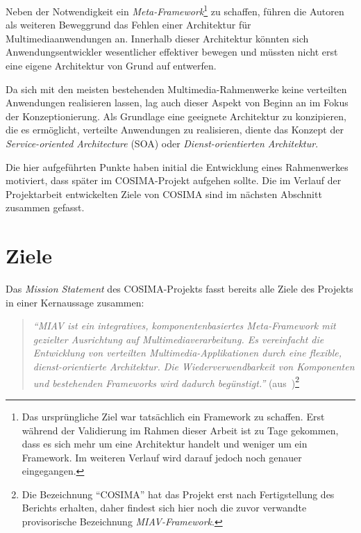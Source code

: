   Neben der Notwendigkeit ein \emph{Meta-Framework}\footnote{Das ursprüngliche Ziel war tatsächlich ein Framework zu schaffen. Erst während der Validierung im Rahmen dieser Arbeit ist zu Tage gekommen, dass es sich mehr um eine Architektur handelt und weniger um ein Framework. Im weiteren Verlauf wird darauf jedoch noch genauer eingegangen.} zu schaffen, führen die Autoren als weiteren Beweggrund das Fehlen einer Architektur für Multimediaanwendungen an. Innerhalb dieser Architektur könnten sich Anwendungsentwickler wesentlicher effektiver bewegen und müssten nicht erst eine eigene Architektur von Grund auf entwerfen.
  
  Da sich mit den meisten bestehenden Multimedia-Rahmenwerke keine verteilten Anwendungen realisieren lassen, lag auch dieser Aspekt von Beginn an im Fokus der Konzeptionierung. Als Grundlage eine geeignete Architektur zu konzipieren, die es ermöglicht, verteilte Anwendungen zu realisieren, diente das Konzept der \emph{Service-oriented Architecture} (SOA) oder \emph{Dienst-orientierten Architektur}.
  
  Die hier aufgeführten Punkte haben initial die Entwicklung eines Rahmenwerkes motiviert, dass später im COSIMA-Projekt aufgehen sollte. Die im Verlauf der Projektarbeit entwickelten Ziele von COSIMA sind im nächsten Abschnitt zusammen gefasst.

  
\section{Ziele} %
\label{sec:ziele_cosima}

  Das \emph{Mission Statement} des COSIMA-Projekts fasst bereits alle Ziele des Projekts in einer Kernaussage zusammen:

  \begin{quote}
    \emph{``MIAV ist ein integratives, komponentenbasiertes Meta-Framework mit gezielter Ausrichtung auf Multimediaverarbeitung. Es vereinfacht die Entwicklung von verteilten Multimedia-Applikationen durch eine flexible, dienst-orientierte Architektur. Die Wiederverwendbarkeit von Komponenten und bestehenden Frameworks wird dadurch begünstigt.''} (aus~\citep[S. 2]{bericht})\footnote{Die Bezeichnung "`COSIMA"' hat das Projekt erst nach Fertigstellung des Berichts erhalten, daher findest sich hier noch die zuvor verwandte provisorische Bezeichnung \emph{MIAV-Framework}.}
  \end{quote}

